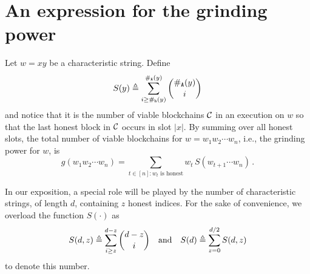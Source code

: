
\section{An expression for the grinding power} 
Let $w = xy$ be a characteristic string. 
Define
\begin{equation}\label{eq:S_y}
    S(y) 
    \triangleq \sum_{i \geq \#_{\mathtt{h}}(y)}^{\#_{\mathtt{A}}(y)}{ \binom{\#_{\mathtt{A}}(y)}{i} } 
\end{equation}
and notice that it is the number of viable blockchains $\mathcal{C}$
in an execution on $w$ 
so that the last honest block in $\mathcal{C}$ occurs in slot $|x|$. 
By summing over all honest slots, 
the total number of viable blockchains for $w = w_1 w_2 \cdots w_n$,
i.e., the grinding power for $w$, is 
\begin{equation}\label{eq:g_praos}
    g(w_1 w_2 \cdots w_n) 
    = \sum_{ \text{$t \in [n] : w_t$ is honest} }
      w_t\, S(w_{t+1} \cdots w_n)
    \,.  
\end{equation}


In our exposition, a special role will be played by
the number of characteristic strings, 
of length $d$, containing $z$ honest indices.
For the sake of convenience, 
we overload the function $S(\cdot)$ as 
\begin{equation}\label{eq:S_d_z}
  S(d, z) 
    \triangleq \sum_{i \geq z}^{d-z}{ \binom{d-z}{i} } 
    \quad\text{and}\quad
  S(d) \triangleq \sum_{z = 0}^{d/2} S(d,z)
\end{equation}
to denote this number.

